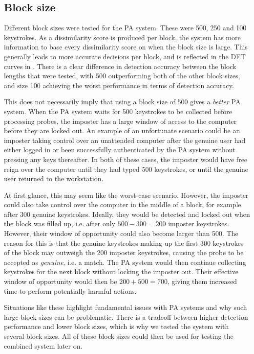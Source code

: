 \subsection{Block size}
\label{sec:analysis-PA-block-size}
Different block sizes were tested for the PA system.
These were 500, 250 and 100 keystrokes.
As a dissimilarity score is produced per block, the system has more information to base every dissimilarity score on when the block size is large.
This generally leads to more accurate decisions per block, and is reflected in the DET curves in .
There is a clear difference in detection accuracy between the block lengths that were tested, with 500 outperforming both of the other block sizes, and size 100 achieving the worst performance in terms of detection accuracy.

This does not necessarily imply that using a block size of 500 gives a \textit{better} PA system.
When the PA system waits for 500 keystrokes to be collected before processing probes, the imposter has a large window of access to the computer before they are locked out.
An example of an unfortunate scenario could be an imposter taking control over an unattended computer after the genuine user had either logged in or been successfully authenticated by the PA system without pressing any keys thereafter.
In both of these cases, the imposter would have free reign over the computer until they had typed 500 keystrokes, or until the genuine user returned to the workstation.

At first glance, this may seem like the worst-case scenario.
However, the imposter could also take control over the computer in the middle of a block, for example after 300 genuine keystrokes.
Ideally, they would be detected and locked out when the block was filled up, i.e. after only $500-300 = 200$ imposter keystrokes.
However, their window of opportunity could also become larger than 500.
The reason for this is that the genuine keystrokes making up the first 300 keystrokes of the block may outweigh the 200 imposter keystrokes, causing the probe to be accepted as \textit{genuine}, i.e. a match.
The PA system would then continue collecting keystrokes for the next block without locking the imposter out.
Their effective window of opportunity would then be $200+500 = 700$, giving them increased time to perform potentially harmful actions.

Situations like these highlight fundamental issues with PA systems and why such large block sizes can be problematic.
There is a tradeoff between higher detection performance and lower block sizes, which is why we tested the system with several block sizes.
All of these block sizes could then be used for testing the combined system later on.

